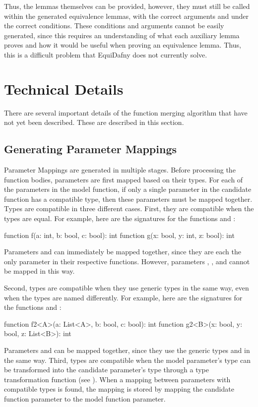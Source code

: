 Thus, the lemmas themselves can be provided, however, they must still be called within the generated equivalence lemmas, with the correct arguments and under the correct conditions. These conditions and arguments cannot be easily generated, since this requires an understanding of what each auxiliary lemma proves and how it would be useful when proving an equivalence lemma. Thus, this is a difficult problem that EquiDafny does not currently solve. 

\section{Technical Details}\label{sec:technical-details}

There are several important details of the function merging algorithm that have not yet been described. These are described in this section. 

\subsection{Generating Parameter Mappings}\label{sec:parameter-mappings}

Parameter Mappings are generated in multiple stages. Before processing the function bodies, parameters are first mapped based on their types. For each of the parameters in the model function, if only a single parameter in the candidate function has a compatible type, then these parameters must be mapped together. Types are compatible in three different cases. First, they are compatible when the types are equal. For example, here are the signatures for the functions  and :
\begin{dafny}
function f(a: int, b: bool, c: bool): int
function g(x: bool, y: int, z: bool): int
\end{dafny}
%
Parameters  and  can immediately be mapped together, since they are each the only  parameter in their respective functions. However, parameters , ,  and  cannot be mapped in this way. 

Second, types are compatible when they use generic types in the same way, even when the types are named differently. For example, here are the signatures for the functions  and :
\begin{dafny}
function f2<A>(a: List<A>, b: bool, c: bool): int
function g2<B>(x: bool, y: bool, z: List<B>): int
\end{dafny}
%
Parameters  and  can be mapped together, since they use the generic types  and  in the same way. Third, types are compatible when the model parameter's type can be transformed into the candidate parameter's type through a type transformation function (see ). When a mapping between parameters with compatible types is found, the mapping is stored by mapping the candidate function parameter to the model function parameter.

